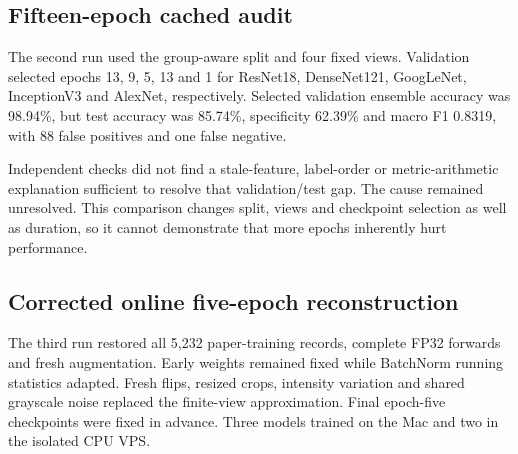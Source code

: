 \documentclass[conference]{IEEEtran}
\begin{document}
\subsection{Fifteen-epoch cached audit}
The second run used the group-aware split and four fixed views. Validation selected epochs 13, 9, 5, 13 and 1 for ResNet18, DenseNet121, GoogLeNet, InceptionV3 and AlexNet, respectively. Selected validation ensemble accuracy was 98.94\%, but test accuracy was 85.74\%, specificity 62.39\% and macro F1 0.8319, with 88 false positives and one false negative.

Independent checks did not find a stale-feature, label-order or metric-arithmetic explanation sufficient to resolve that validation/test gap. The cause remained unresolved. This comparison changes split, views and checkpoint selection as well as duration, so it cannot demonstrate that more epochs inherently hurt performance.

\subsection{Corrected online five-epoch reconstruction}
The third run restored all 5,232 paper-training records, complete FP32 forwards and fresh augmentation. Early weights remained fixed while BatchNorm running statistics adapted. Fresh flips, resized crops, intensity variation and shared grayscale noise replaced the finite-view approximation. Final epoch-five checkpoints were fixed in advance. Three models trained on the Mac and two in the isolated CPU VPS.
\end{document}
